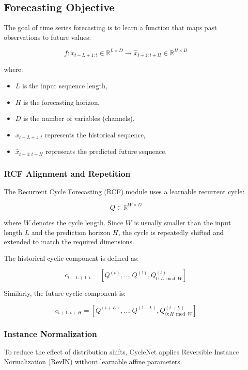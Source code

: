 \documentclass[10pt]{article}
\begin{document}
\subsection{Forecasting Objective}

The goal of time series forecasting is to learn a function that maps past observations to future values:

\[
f : x_{t-L+1:t} \in \mathbb{R}^{L \times D}
\rightarrow
\hat{x}_{t+1:t+H} \in \mathbb{R}^{H \times D}
\]

where:
\begin{itemize}
    \item $L$ is the input sequence length,
    \item $H$ is the forecasting horizon,
    \item $D$ is the number of variables (channels),
    \item $x_{t-L+1:t}$ represents the historical sequence,
    \item $\hat{x}_{t+1:t+H}$ represents the predicted future sequence.
\end{itemize}

\subsubsection{RCF Alignment and Repetition}

The Recurrent Cycle Forecasting (RCF) module uses a learnable recurrent cycle:

\[
Q \in \mathbb{R}^{W \times D}
\]

where $W$ denotes the cycle length. Since $W$ is usually smaller than the input length $L$ and the prediction horizon $H$, the cycle is repeatedly shifted and extended to match the required dimensions.

The historical cyclic component is defined as:

\[
c_{t-L+1:t}
=
\left[
Q^{(t)}, \dots, Q^{(t)},
Q_{0:L \bmod W}^{(t)}
\right]
\]

Similarly, the future cyclic component is:

\[
c_{t+1:t+H}
=
\left[
Q^{(t+L)}, \dots, Q^{(t+L)},
Q_{0:H \bmod W}^{(t+L)}
\right]
\]

\subsubsection{Instance Normalization}

To reduce the effect of distribution shifts, CycleNet applies Reversible Instance Normalization (RevIN) without learnable affine parameters.
\end{document}
